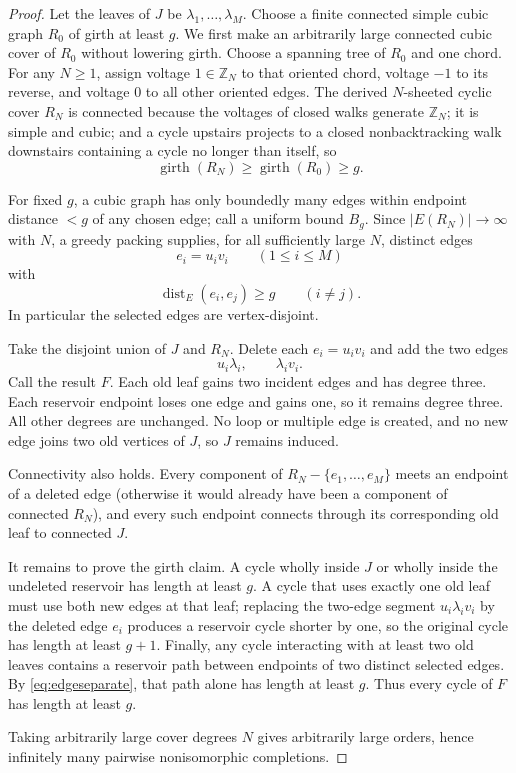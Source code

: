 \documentclass[11pt]{article}
\begin{document}
\begin{proof}
Let the leaves of $J$ be $\lambda_1,\ldots,\lambda_M$.  Choose a finite connected simple cubic graph $R_0$ of girth at least $g$.  We first make an arbitrarily large connected cubic cover of $R_0$ without lowering girth.  Choose a spanning tree of $R_0$ and one chord.  For any $N\ge1$, assign voltage $1\in\mathbb Z_N$ to that oriented chord, voltage $-1$ to its reverse, and voltage $0$ to all other oriented edges.  The derived $N$-sheeted cyclic cover $R_N$ is connected because the voltages of closed walks generate $\mathbb Z_N$; it is simple and cubic; and a cycle upstairs projects to a closed nonbacktracking walk downstairs containing a cycle no longer than itself, so
\[
 \operatorname{girth}(R_N)\ge\operatorname{girth}(R_0)\ge g.
\]

For fixed $g$, a cubic graph has only boundedly many edges within endpoint distance $<g$ of any chosen edge; call a uniform bound $B_g$.  Since $|E(R_N)|\to\infty$ with $N$, a greedy packing supplies, for all sufficiently large $N$, distinct edges
\[
 e_i=u_iv_i\qquad(1\le i\le M)
\]
with
\begin{equation}\label{eq:edgeseparate}
 \operatorname{dist}_E(e_i,e_j)\ge g\qquad(i\ne j).
\end{equation}
In particular the selected edges are vertex-disjoint.

Take the disjoint union of $J$ and $R_N$.  Delete each $e_i=u_iv_i$ and add the two edges
\[
 u_i\lambda_i,\qquad \lambda_iv_i.
\]
Call the result $F$.  Each old leaf gains two incident edges and has degree three.  Each reservoir endpoint loses one edge and gains one, so it remains degree three.  All other degrees are unchanged.  No loop or multiple edge is created, and no new edge joins two old vertices of $J$, so $J$ remains induced.

Connectivity also holds.  Every component of $R_N-\{e_1,\ldots,e_M\}$ meets an endpoint of a deleted edge (otherwise it would already have been a component of connected $R_N$), and every such endpoint connects through its corresponding old leaf to connected $J$.

It remains to prove the girth claim.  A cycle wholly inside $J$ or wholly inside the undeleted reservoir has length at least $g$.  A cycle that uses exactly one old leaf must use both new edges at that leaf; replacing the two-edge segment $u_i\lambda_iv_i$ by the deleted edge $e_i$ produces a reservoir cycle shorter by one, so the original cycle has length at least $g+1$.  Finally, any cycle interacting with at least two old leaves contains a reservoir path between endpoints of two distinct selected edges.  By \eqref{eq:edgeseparate}, that path alone has length at least $g$.  Thus every cycle of $F$ has length at least $g$.

Taking arbitrarily large cover degrees $N$ gives arbitrarily large orders, hence infinitely many pairwise nonisomorphic completions.
\end{proof}
\end{document}
